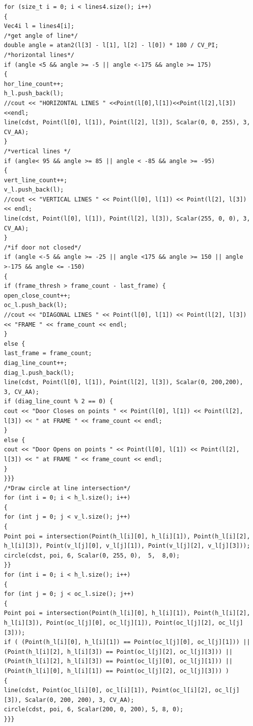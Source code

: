 \documentclass{article}
\begin{document}
\begin{lstlisting}
for (size_t i = 0; i < lines4.size(); i++)
{
Vec4i l = lines4[i];
/*get angle of line*/
double angle = atan2(l[3] - l[1], l[2] - l[0]) * 180 / CV_PI;
/*horizontal lines*/
if (angle <5 && angle >= -5 || angle <-175 && angle >= 175)
{
hor_line_count++;
h_l.push_back(l);
//cout << "HORIZONTAL LINES " <<Point(l[0],l[1])<<Point(l[2],l[3]) <<endl;
line(cdst, Point(l[0], l[1]), Point(l[2], l[3]), Scalar(0, 0, 255), 3, CV_AA);
}
/*vertical lines */
if (angle< 95 && angle >= 85 || angle < -85 && angle >= -95)
{
vert_line_count++;
v_l.push_back(l);
//cout << "VERTICAL LINES " << Point(l[0], l[1]) << Point(l[2], l[3]) << endl;
line(cdst, Point(l[0], l[1]), Point(l[2], l[3]), Scalar(255, 0, 0), 3, CV_AA);		
}
/*if door not closed*/
if (angle <-5 && angle >= -25 || angle <175 && angle >= 150 || angle >-175 && angle <= -150)
{
if (frame_thresh > frame_count - last_frame) {
open_close_count++;
oc_l.push_back(l);
//cout << "DIAGONAL LINES " << Point(l[0], l[1]) << Point(l[2], l[3]) << "FRAME " << frame_count << endl;
}
else {
last_frame = frame_count;
diag_line_count++;
diag_l.push_back(l);
line(cdst, Point(l[0], l[1]), Point(l[2], l[3]), Scalar(0, 200,200), 3, CV_AA);
if (diag_line_count % 2 == 0) {
cout << "Door Closes on points " << Point(l[0], l[1]) << Point(l[2], l[3]) << " at FRAME " << frame_count << endl;
}
else {
cout << "Door Opens on points " << Point(l[0], l[1]) << Point(l[2], l[3]) << " at FRAME " << frame_count << endl;
}
}}}
/*Draw circle at line intersection*/
for (int i = 0; i < h_l.size(); i++)
{
for (int j = 0; j < v_l.size(); j++)
{
Point poi = intersection(Point(h_l[i][0], h_l[i][1]), Point(h_l[i][2], h_l[i][3]), Point(v_l[j][0], v_l[j][1]), Point(v_l[j][2], v_l[j][3]));
circle(cdst, poi, 6, Scalar(0, 255, 0),  5,  8,0);
}}
for (int i = 0; i < h_l.size(); i++)
{
for (int j = 0; j < oc_l.size(); j++)
{
Point poi = intersection(Point(h_l[i][0], h_l[i][1]), Point(h_l[i][2], h_l[i][3]), Point(oc_l[j][0], oc_l[j][1]), Point(oc_l[j][2], oc_l[j][3]));
if ( (Point(h_l[i][0], h_l[i][1]) == Point(oc_l[j][0], oc_l[j][1])) || (Point(h_l[i][2], h_l[i][3]) == Point(oc_l[j][2], oc_l[j][3])) || (Point(h_l[i][2], h_l[i][3]) == Point(oc_l[j][0], oc_l[j][1])) || (Point(h_l[i][0], h_l[i][1]) == Point(oc_l[j][2], oc_l[j][3])) )
{
line(cdst, Point(oc_l[i][0], oc_l[i][1]), Point(oc_l[i][2], oc_l[j][3]), Scalar(0, 200, 200), 3, CV_AA);
circle(cdst, poi, 6, Scalar(200, 0, 200), 5, 8, 0);
}}}

\end{lstlisting}
\end{document}
